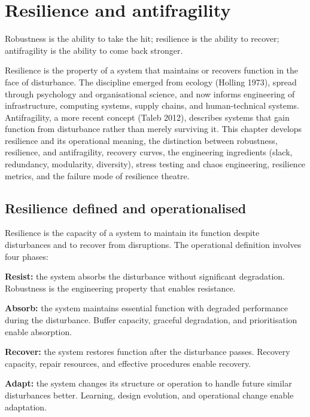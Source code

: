 \chapter{Resilience and antifragility}
\label{vol09:ch17}

\epigraph{Robustness is the ability to take the hit; resilience is the ability to recover; antifragility is the ability to come back stronger.}{}


\noindent
Resilience is the property of a system that maintains or recovers function in the face of disturbance. The discipline emerged from ecology (Holling 1973), spread through psychology and organisational science, and now informs engineering of infrastructure, computing systems, supply chains, and human-technical systems. Antifragility, a more recent concept (Taleb 2012), describes systems that gain function from disturbance rather than merely surviving it. This chapter develops resilience and its operational meaning, the distinction between robustness, resilience, and antifragility, recovery curves, the engineering ingredients (slack, redundancy, modularity, diversity), stress testing and chaos engineering, resilience metrics, and the failure mode of resilience theatre.

\section{Resilience defined and operationalised}

Resilience is the capacity of a system to maintain its function despite disturbances and to recover from disruptions. The operational definition involves four phases:

\textbf{Resist:} the system absorbs the disturbance without significant degradation. Robustness is the engineering property that enables resistance.

\textbf{Absorb:} the system maintains essential function with degraded performance during the disturbance. Buffer capacity, graceful degradation, and prioritisation enable absorption.

\textbf{Recover:} the system restores function after the disturbance passes. Recovery capacity, repair resources, and effective procedures enable recovery.

\textbf{Adapt:} the system changes its structure or operation to handle future similar disturbances better. Learning, design evolution, and operational change enable adaptation.

